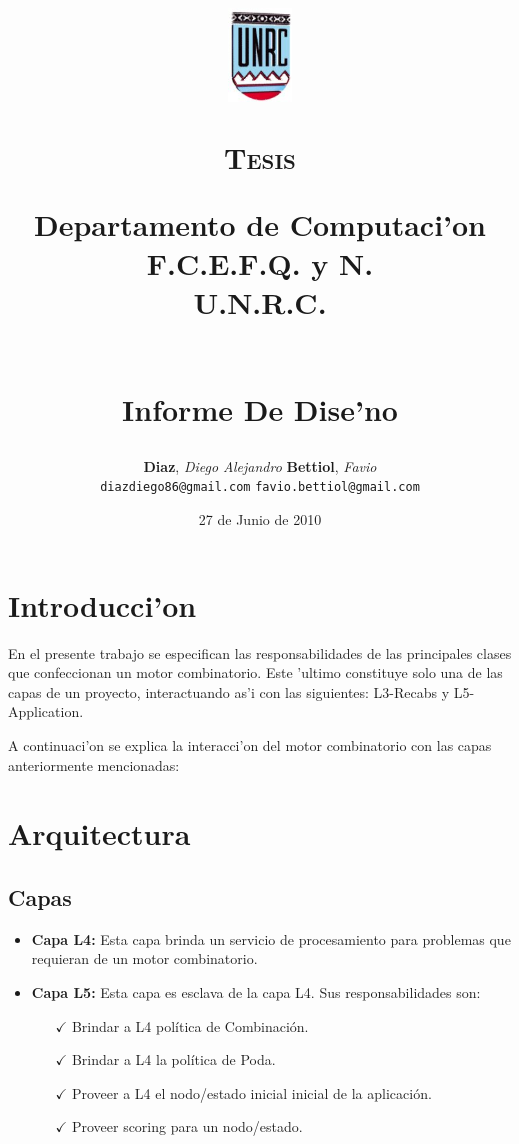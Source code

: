 \documentclass[a4paper,10pt,twoside]{article}
\title{
    \includegraphics[width=50pt,height=70pt]{unrc.jpg}\\
    \begin{large}\textsc{Tesis}\\ \end{large}
    \small
        \textbf{Departamento de Computaci'on} \\
        \textbf{F.C.E.F.Q. y N.} \\
        \textbf{U.N.R.C.}
     \\ [4cm]
    \begin{Huge}\ra        \end{Huge} \\
    \small Informe De Dise'no\\[3cm]
}
\author{\textbf{Diaz}, \textit{Diego Alejandro} \hspace{4cm} \textbf{Bettiol}, \textit{Favio}\\
        \small{\texttt{diazdiego86@gmail.com}}  \hspace{6cm}  \small{\texttt{favio.bettiol@gmail.com}} \\[3cm]
}
\date{27 de Junio de 2010}
\begin{document}
    \pagestyle{myheadings}
    
    \maketitle
    \newpage
    \tableofcontents
    \newpage

	\section{Introducci'on}
En el presente trabajo se especifican las responsabilidades de las principales clases que confeccionan un motor combinatorio. Este 'ultimo constituye solo una de las capas de un proyecto, interactuando as'i con las siguientes: L3-Recabs y L5-Application.

A continuaci'on se explica la interacci'on del motor combinatorio con las capas anteriormente mencionadas:
	
    \section{Arquitectura}



        \subsection{Capas}
            \begin{itemize}
                \item \textbf{Capa L4:} Esta capa brinda un servicio de procesamiento para problemas que requieran de un motor combinatorio.
                
                \item \textbf{Capa L5:} Esta capa es esclava de la capa L4. Sus responsabilidades son:
                \begin{itemize}
				    \item [$\checkmark$] Brindar a L4 pol\'itica de Combinaci\'on.
				    \item [$\checkmark$] Brindar a L4 la pol\'itica de Poda.
				    \item [$\checkmark$] Proveer a L4 el nodo/estado inicial inicial de la aplicaci\'on.
				    \item [$\checkmark$] Proveer scoring para un nodo/estado.
                \end{itemize}
            \end{itemize}
                
\end{document}
